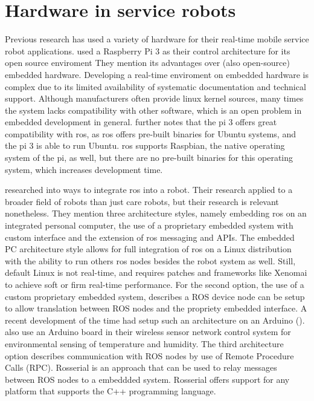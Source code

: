 \documentclass[12pt]{scrreprt}
\begin{document}
\section{Hardware in service robots}
\label{tHardware}
Previous research has used a variety of hardware for their real-time mobile service robot applications. \citeauthor{delgado} used a Raspberry Pi 3 as their control architecture for its open source enviroment They mention its advantages over (also open-source) embedded hardware. Developing a real-time enviroment on embedded hardware is complex due to its limited availability of systematic documentation and technical support. Although manufacturers often provide linux kernel sources, many times the system lacks compatibility with other software, which is an open problem in embedded development in general. \citeauthor{delgado} further notes that the \gls{pi} 3 offers great compatibility with \acrfull{ros}, as \acrshort{ros} offers pre-built binaries for Ubuntu systems, and the \gls{pi} 3 is able to run Ubuntu. \acrshort{ros} supports Raspbian, the native operating system of the \gls{pi}, as well, but there are no pre-built  binaries for this operating system, which increases development time.
\par
\citeauthor{bouchier} researched into ways to integrate \acrshort{ros} into a robot. Their research applied to a broader field of robots than just care robots, but their research is relevant nonetheless. They mention three architecture styles, namely embedding \acrshort{ros} on an integrated personal computer, the use of a proprietary embedded system with custom interface and the extension of \acrshort{ros} messaging and APIs. The embedded PC architecture style allows for full integration of \acrshort{ros} on a Linux distribution with the ability to run others \acrshort{ros} nodes besides the robot system as well. Still, default Linux is not real-time, and requires patches and frameworks like Xenomai to achieve soft or firm real-time performance. For the second option, the use of a custom proprietary embedded system, \citeauthor{bouchier} describes a ROS device node can be setup to allow translation between ROS nodes and the propriety embedded interface. A recent development of the time had setup such an architecture on an Arduino (\cite{bouchier}). \citeauthor{arduino} also use an Arduino board in their wireless sensor network control system for environmental sensing of temperature and humidity. The third architecture  option describes communication with ROS nodes by use of Remote Procedure Calls (RPC). Rosserial is an approach that can be used to relay messages between ROS nodes to a embeddded system. Rosserial offers support for any platform that supports the C++ programming language.
\end{document}
